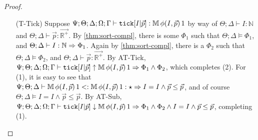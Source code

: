 \begin{proof}
\begin{itemize}
  
  \item[(T-Tick)] Suppose $\Psi ; \Theta ; \Delta ; \Omega ; \Gamma \vdash \texttt{tick}[I|\vec{p}] : \mathbb{M} \, \phi(I,\vec{p})\, 1$ by way of
  $\Theta ; \Delta \vdash I : \mathbb{N}$ and
  $\Theta ; \Delta \vdash \vec{p} : \vec{\mathbb{R}^+}$.
  By \autoref{thm:sort-compl}, there is some $\Phi_1$ such that
  $\Theta ; \Delta \vDash \Phi_1$, and
  $\Theta ; \Delta \vdash I : \mathbb{N} \Rightarrow \Phi_1$.
  Again by \autoref{thm:sort-compl}, there is a $\Phi_2$ such that
  $\Theta ; \Delta \vDash \Phi_2$, and
  $\Theta ; \Delta \vdash \vec{p} : \vec{\mathbb{R}^+}$.
  By AT-Tick,
  $\Psi ; \Theta ; \Delta ; \Omega ; \Gamma \vdash \texttt{tick}[I|\vec{p}] \uparrow \mathbb{M} \, \phi(I,\vec{p})\, 1 \Rightarrow \Phi_1 \wedge \Phi_2$,
  which completes (2).
  For (1), it is easy to see that $\Psi ; \Theta ; \Delta \vdash \mathbb{M} \, \phi(I,\vec{p})\, 1 <: \mathbb{M} \, \phi(I,\vec{p})\, 1 : \star \Rightarrow I = I \wedge \vec{p} \leq \vec{p}$, and of course $\Theta ; \Delta \vDash I = I \wedge \vec{p} \leq \vec{p}$.
  By AT-Sub,
  $\Psi ; \Theta ; \Delta ; \Omega ; \Gamma \vdash \texttt{tick}[I|\vec{p}] \downarrow \mathbb{M} \, \phi(I,\vec{p})\, 1 \Rightarrow \Phi_1 \wedge \Phi_2 \wedge  I = I \wedge \vec{p} \leq \vec{p}$, completing (1).
  

\end{itemize}
\end{proof}

